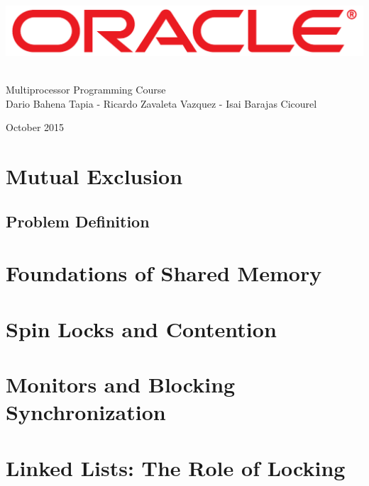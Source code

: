 \documentclass[letter,12pt]{report}
\begin{document}
\begin{titlepage}
\begin{center}

~\\[4 cm]

\includegraphics[width=15 cm]{Oracle_Logo.pdf}

~\\[0.5 cm]

{\LARGE Multiprocessor Programming Course} \\[0.2 cm]

{Dario Bahena Tapia - Ricardo Zavaleta Vazquez - Isai Barajas Cicourel}

{\small October 2015}

\end{center}
\end{titlepage}


\chapter{Mutual Exclusion}
\section{Problem Definition}



\chapter{Foundations of Shared Memory}




\chapter{Spin Locks and Contention}





\chapter{Monitors and Blocking Synchronization}


\chapter{Linked Lists: The Role of Locking}
%
%
\end{document}

